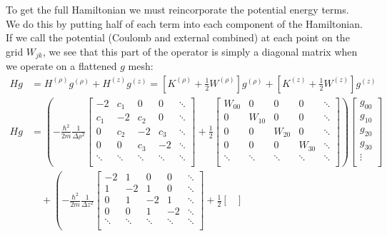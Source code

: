 \documentclass[12pt]{article}
\newcommand{\Hz}{H^{(z)}}
\newcommand{\Hp}{H^{(\rho)}}
\numberwithin{equation}{section}
\begin{document}
To get the full Hamiltonian we must reincorporate the potential energy terms. We do this by putting half of each term into each component of the Hamiltonian. If we call the potential (Coulomb and external combined) at each point on the grid $W_{jk}$, we see that this part of the operator is simply a diagonal matrix when we operate on a flattened $g$ mesh:
\begin{align*}
Hg &= \Hp g^{(\rho)} + \Hz g^{(z)} = \left[K^{(\rho)} + \frac{1}{2} W^{(\rho)}\right] g^{(\rho)} + \left[K^{(z)} + \frac{1}{2} W^{(z)}\right] g^{(z)} \\
Hg &= \left(-\frac{\hbar^2}{2m} \frac{1}{\Delta \rho^2}\begin{bmatrix}
-2 & c_1 & 0 & 0 & \ddots \\
c_1 & -2 & c_2 & 0  & \ddots \\
0 & c_2 & -2 & c_3  & \ddots \\
0 & 0 & c_3 & -2 & \ddots \\
\ddots & \ddots & \ddots & \ddots & \ddots \\
\end{bmatrix}
+
\frac{1}{2}\begin{bmatrix}
W_{00} & 0 & 0 & 0 & \ddots \\
0 & W_{10} & 0 & 0 & \ddots \\
0 & 0 & W_{20} & 0 & \ddots \\
0 & 0 & 0 & W_{30} & \ddots \\
\ddots & \ddots & \ddots & \ddots & \ddots \\
\end{bmatrix} \right)
\begin{bmatrix}
g_{00} \\
g_{10} \\
g_{20} \\
g_{30} \\
\vdots \\
\end{bmatrix} \\
&\quad +\left(-\frac{\hbar^2}{2m} \frac{1}{\Delta z^2}\begin{bmatrix}
-2 & 1 & 0 & 0 & \ddots \\
1 & -2 & 1 & 0  & \ddots \\
0 & 1 & -2 & 1  & \ddots \\
0 & 0 & 1 & -2 & \ddots \\
\ddots & \ddots & \ddots & \ddots & \ddots \\
\end{bmatrix}
+
\frac{1}{2}\begin{bmatrix}

\end{bmatrix}
\end{align*}
\end{document}
